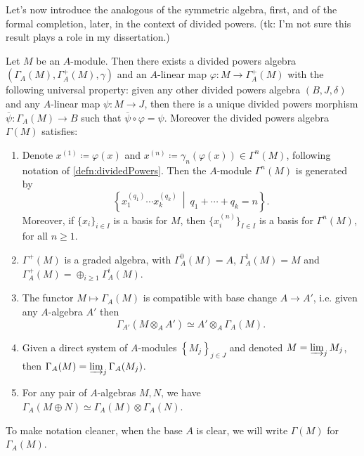 \documentclass[../Main]{subfiles}
\begin{document}
\noindent
Let's now introduce the analogous of the symmetric algebra, first,
and of the formal completion, later,
in the context of divided powers.
(tk: I'm not sure this result plays a role in my dissertation.)


\begin{thm}
	Let $M$ be an $A$-module.
	Then there exists a divided powers algebra 
	$\left(\Gamma_A(M), \Gamma_A^+(M), \gamma\right)$ and an $A$-linear
	map $\varphi\colon M \to \Gamma_A^+(M)$ with the following
	universal property:
	given any other divided powers algebra
	$\left(B, J, \delta\right)$ and any $A$-linear
	map $\psi\colon M \to J$,
	then there is a unique divided powers morphism
	$\overline{\psi}\colon \Gamma_A(M) \to B$
	such that $\overline{\psi} \circ \varphi = \psi$.
	Moreover the divided powers algebra $\Gamma(M)$ satisfies:
\begin{enumerate}
	\item Denote $x^{(1)} \coloneqq \varphi(x)$ and $x^{(n)} \coloneqq \gamma_n(\varphi(x)) \in
		\Gamma^n(M)$, following notation of \cref{defn:dividedPowers}.
		Then the $A$-module $\Gamma^n(M)$ is generated by
		\begin{equation*}
		\left\{ x_1^{(q_1)} \cdots x_k^{(q_k)} \ \middle|\ 
		q_1 + \cdots + q_k = n \right\}
		.\end{equation*}
		Moreover, if $\{ x_i \}_{i \in I}$ is a basis
		for $M$, then $\{ x^{(n)}_i \}_{I \in I}$
		is a basis for $\Gamma^n(M)$,
		for all $n \geq 1$.

	\item $\Gamma^+(M)$ is a graded algebra, with
		$\Gamma_A^0(M) = A$, $\Gamma_A^1(M) = M$
		and $\Gamma_A^+(M) = \oplus_{i \geq 1} \Gamma_A^i(M)$.

	\item The functor $M \mapsto \Gamma_A(M)$ is compatible with
		base change $A \to A'$, i.e. given any $A$-algebra $A'$
		then
		\begin{equation*}
			\Gamma_{A'}(M \otimes_A A') \simeq A' \otimes_A \Gamma_A(M)
		.\end{equation*}

	\item Given a direct system of $A$-modules $\left\{ M_j \right\}_{j \in J}$ 
		and denoted $M = \varinjlim_j M_j$, then $\Gamma_A(M) = \varinjlim_{j} \Gamma_A(M_j)$.

	\item For any pair of $A$-algebras $M, N$, we have $\Gamma_A(M \oplus N)
		\simeq \Gamma_A(M) \otimes \Gamma_A(N)$.
\end{enumerate}
	To make notation cleaner, when the base $A$ is clear, we
	will write $\Gamma(M)$ for $\Gamma_A(M)$.
\end{thm}
\end{document}
